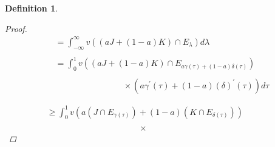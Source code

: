\documentclass[oneside]{book}
\newtheorem{mydef}{Definition}
\begin{document}
\begin{mydef}
\begin{proof}
\[\begin{array}{l}
\quad=\int_{-\infty}^{\infty} v\left((a J+(1-a) K) \cap E_{\lambda}\right) d \lambda \\\\
\quad=\int_{0}^{1} v\left((a J+(1-a) K) \cap E_{a \gamma(\tau)+(1-a) \delta(\tau)}\right) \\\\
 \quad  \quad \quad \quad \quad \quad \quad \quad \quad \times
\left(a \gamma^{\prime}(\tau)+(1-a) (\delta)^{\prime}(\tau)\right) d \tau
\\\\\\
\geq \int_{0}^{1} v\left(a\left(J \cap E_{\gamma(\tau)}\right)+(1-a)\left(K \cap E_{\delta(\tau)}\right)\right)
\\\\
 \quad \quad \quad \quad \quad \quad \quad \quad \quad \quad \quad
 
 \times
 

\end{array}\]
\end{proof}
\end{mydef}
\end{document}

